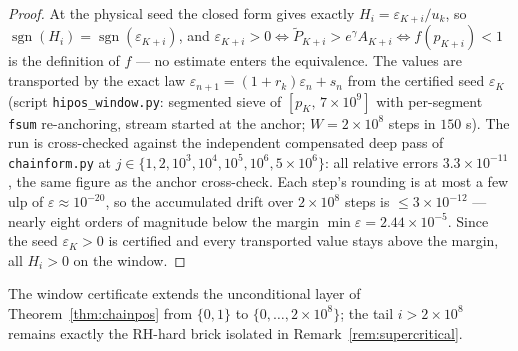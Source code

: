 \documentclass[11pt]{article}
\theoremstyle{remark}
\newcommand{\uk}{u_k}
\newcommand{\rk}{r_k}
\newcommand{\eps}{\varepsilon}
\newcommand{\Ptil}{\widetilde P}
\newcommand{\gam}{\gamma}
\DeclareMathOperator{\sgn}{sgn}
\begin{document}
\begin{proof}
At the physical seed the closed form gives exactly $H_i=\eps_{K+i}/\uk$,
so $\sgn(H_i)=\sgn(\eps_{K+i})$, and $\eps_{K+i}>0\iff
\Ptil_{K+i}>e^\gam A_{K+i}\iff f(p_{K+i})<1$ is the definition of $f$
--- no estimate enters the equivalence. The values are transported by the
exact law $\eps_{n+1}=(1+\rk)\eps_n+s_n$ from the certified seed
$\eps_K$ (script \texttt{hipos\_window.py}: segmented sieve of
$[p_K,\,7\times10^9]$ with per-segment \texttt{fsum} re-anchoring,
stream started at the anchor; $W=2\times10^8$ steps in $150$ s). The run
is cross-checked against the independent compensated deep pass of
\texttt{chainform.py} at $j\in\{1,2,10^3,10^4,10^5,10^6,5\times10^6\}$:
all relative errors $3.3\times10^{-11}$, the same figure as the anchor
cross-check. Each step's rounding is at most a few ulp of
$\eps\approx10^{-20}$, so the accumulated drift over $2\times10^8$ steps
is $\le3\times10^{-12}$ --- nearly eight orders of magnitude below the
margin $\min\eps=2.44\times10^{-5}$. Since the seed $\eps_K>0$ is certified and
every transported value stays above the margin, all $H_i>0$ on the
window.
\end{proof}

\noindent
The window certificate extends the unconditional layer of
Theorem~\ref{thm:chainpos} from $\{0,1\}$ to $\{0,\dots,2\times10^8\}$;
the tail $i>2\times10^8$ remains exactly the RH-hard brick isolated in
Remark~\ref{rem:supercritical}.
\end{document}
